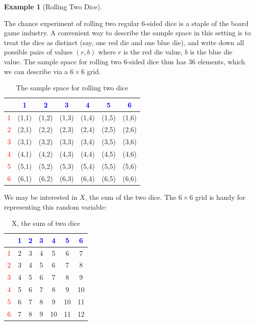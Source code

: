 \documentclass[
]{book}
\theoremstyle{definition}
\theoremstyle{definition}
\newtheorem{example}{Example}[chapter]
\theoremstyle{definition}
\theoremstyle{definition}
\theoremstyle{remark}
\begin{document}
\begin{example}[Rolling Two Dice]
\protect\hypertarget{exm:roll2dice}{}\label{exm:roll2dice}

The chance experiment of rolling two regular 6-sided dice is a staple of the board game industry. A convenient way to describe the sample space in this setting is to treat the dice as distinct (say, one red die and one blue die), and write down all possible pairs of values \((r,b)\) where \(r\) is the red die value, \(b\) is the blue die value. The sample space for rolling two 6-sided dice thus has 36 elements, which we can describe via a \(6 \times 6\) grid.

\begin{table}[!h]
\centering\centering
\caption{\label{tab:unnamed-chunk-3}The sample space for rolling two dice}
\centering
\begin{tabular}[t]{>{}l||>{}c|c|c|c|c|c}
\hline
\textcolor{blue}{ } & \textcolor{blue}{1} & \textcolor{blue}{2} & \textcolor{blue}{3} & \textcolor{blue}{4} & \textcolor{blue}{5} & \textcolor{blue}{6}\\
\hline
\textcolor{red}{1} & (1,1) & (1,2) & (1,3) & (1,4) & (1,5) & (1,6)\\
\hline
\textcolor{red}{2} & (2,1) & (2,2) & (2,3) & (2,4) & (2,5) & (2,6)\\
\hline
\textcolor{red}{3} & (3,1) & (3,2) & (3,3) & (3,4) & (3,5) & (3,6)\\
\hline
\textcolor{red}{4} & (4,1) & (4,2) & (4,3) & (4,4) & (4,5) & (4,6)\\
\hline
\textcolor{red}{5} & (5,1) & (5,2) & (5,3) & (5,4) & (5,5) & (5,6)\\
\hline
\textcolor{red}{6} & (6,1) & (6,2) & (6,3) & (6,4) & (6,5) & (6,6)\\
\hline
\end{tabular}
\end{table}

We may be interested in \(X\), the sum of the two dice. The \(6 \times 6\) grid is handy for representing this random variable:

\begin{table}[!h]
\centering\centering
\caption{\label{tab:unnamed-chunk-4}X, the sum of two dice}
\centering
\begin{tabular}[t]{>{}l||>{}c|c|c|c|c|c}
\hline
\textcolor{blue}{ } & \textcolor{blue}{1} & \textcolor{blue}{2} & \textcolor{blue}{3} & \textcolor{blue}{4} & \textcolor{blue}{5} & \textcolor{blue}{6}\\
\hline
\textcolor{red}{1} & 2 & 3 & 4 & 5 & 6 & 7\\
\hline
\textcolor{red}{2} & 3 & 4 & 5 & 6 & 7 & 8\\
\hline
\textcolor{red}{3} & 4 & 5 & 6 & 7 & 8 & 9\\
\hline
\textcolor{red}{4} & 5 & 6 & 7 & 8 & 9 & 10\\
\hline
\textcolor{red}{5} & 6 & 7 & 8 & 9 & 10 & 11\\
\hline
\textcolor{red}{6} & 7 & 8 & 9 & 10 & 11 & 12\\
\hline
\end{tabular}
\end{table}


\end{example}
\end{document}
